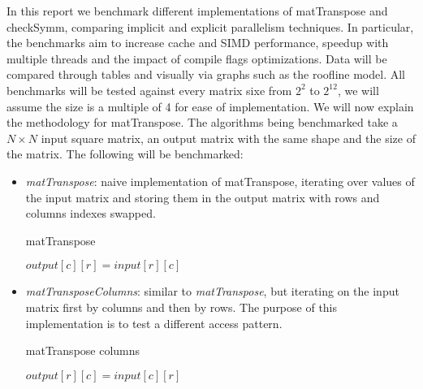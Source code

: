 \documentclass[conference]{IEEEtran}
\begin{document}
In this report we benchmark different implementations of matTranspose
and checkSymm, comparing implicit and explicit parallelism
techniques. In particular, the benchmarks aim to increase cache and SIMD performance,
speedup with multiple threads and the impact of compile flags optimizations. Data will be compared through tables
and visually via graphs such as the roofline model. All benchmarks
will be tested against every matrix sixe from $2^2$ to $2^{12}$, we will assume the size is a multiple of 4 for ease of implementation.
We will now explain the methodology for matTranspose.
The algorithms being benchmarked take a $N \times N$ input square matrix, an output matrix with the same shape and the size of the matrix.
The following will be benchmarked:
\begin{itemize}
\item \textit{matTranspose}: naive implementation of matTranspose, iterating over values of the input matrix and storing them in the output matrix with rows and columns indexes swapped.

  \begin{algorithm}
    \caption{matTranspose}\label{matTranspose}
    \begin{algoritmic}[1]
            \State {}
            \State $output[c][r] = input[r][c]$
            \EndFor
        \EndFor
      \EndProcedure
    \end{algoritmic}
  \end{algorithm}

    \item \textit{matTransposeColumns}: similar to \textit{matTranspose}, but iterating on the input matrix first by columns and then by rows.
  The purpose of this implementation is to test a different access pattern.

  \begin{algorithm}
    \caption{matTranspose columns}\label{matTranspose}
    \begin{algoritmic}[1]
            \State {}
            \State $output[r][c] = input[c][r]$
            \EndFor
        \EndFor
      \EndProcedure
    \end{algoritmic}
  \end{algorithm}


\end{itemize}
\end{document}
